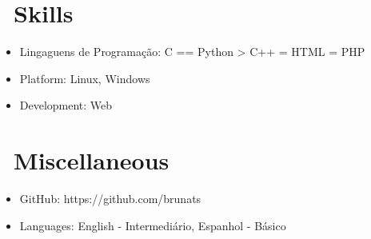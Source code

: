 \documentclass{resume}
\begin{document}

\section{\faCogs\ Skills}
\begin{itemize}[parsep=0.5ex]
  \item Lingaguens de Programação: C == Python > C++ = HTML = PHP
  \item Platform: Linux, Windows
  \item Development: Web
\end{itemize}

\section{\faInfo\ Miscellaneous}
\begin{itemize}[parsep=0.5ex]
  \item GitHub: https://github.com/brunats
  \item Languages: English - Intermediário, Espanhol - Básico
\end{itemize}

%
%
\end{document}
